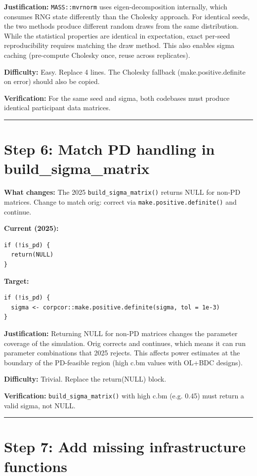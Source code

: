 \documentclass[11pt]{article}
\begin{document}
\textbf{Justification:} \texttt{MASS::mvrnorm} uses eigen-decomposition
internally, which consumes RNG state differently than the Cholesky
approach. For identical seeds, the two methods produce different
random draws from the same distribution. While the statistical
properties are identical in expectation, exact per-seed
reproducibility requires matching the draw method. This also
enables sigma caching (pre-compute Cholesky once, reuse across
replicates).

\textbf{Difficulty:} Easy. Replace 4 lines. The Cholesky fallback
(make.positive.definite on error) should also be copied.

\textbf{Verification:} For the same seed and sigma, both codebases
must produce identical participant data matrices.

\bigskip\noindent\rule{\textwidth}{0.4pt}\bigskip

\section{Step 6: Match PD handling in build\_sigma\_matrix}

\textbf{What changes:} The 2025 \texttt{build\_sigma\_matrix()} returns NULL
for non-PD matrices. Change to match orig: correct via
\texttt{make.positive.definite()} and continue.

\textbf{Current (2025):}
\begin{lstlisting}
if (!is_pd) {
  return(NULL)
}
\end{lstlisting}

\textbf{Target:}
\begin{lstlisting}
if (!is_pd) {
  sigma <- corpcor::make.positive.definite(sigma, tol = 1e-3)
}
\end{lstlisting}

\textbf{Justification:} Returning NULL for non-PD matrices changes the
parameter coverage of the simulation. Orig corrects and continues,
which means it can run parameter combinations that 2025 rejects.
This affects power estimates at the boundary of the PD-feasible
region (high c.bm values with OL+BDC designs).

\textbf{Difficulty:} Trivial. Replace the return(NULL) block.

\textbf{Verification:} \texttt{build\_sigma\_matrix()} with high c.bm (e.g. 0.45)
must return a valid sigma, not NULL.

\bigskip\noindent\rule{\textwidth}{0.4pt}\bigskip

\section{Step 7: Add missing infrastructure functions}
\end{document}
